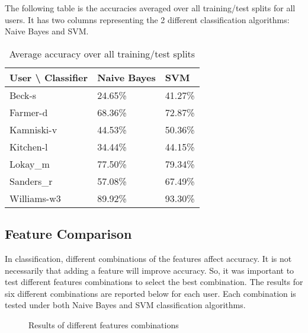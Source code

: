 The following table is the accuracies averaged over all training/test splits for all users. It has two columns representing the 2 different classification algorithms: Naive Bayes and SVM.

\begin{table}
	\begin{center}

	    \begin{tabular}{ | l | l | l |}
	    \hline
	    User {\textbackslash}  Classifier & Naive Bayes & SVM \\ \hline
	    Beck-s & 24.65\% & 41.27\% \\ \hline
	    Farmer-d & 68.36\% & 72.87\% \\ \hline
	    Kamniski-v & 44.53\% & 50.36\% \\ \hline
	    Kitchen-l & 34.44\% & 44.15\% \\ \hline
	    Lokay\_m & 77.50\% & 79.34\% \\ \hline
	    Sanders\_r & 57.08\% & 67.49\% \\ \hline
	    Williams-w3 & 89.92\% & 93.30\% \\
	    \hline
	    \end{tabular}
	\caption{Average accuracy over all training/test splits}
	\end{center}
\end{table}

\subsection{Feature Comparison}
In classification, different combinations of the features affect accuracy. It is not necessarily that adding a feature will improve accuracy. So, it was important to test different features combinations to select the best combination. The results for six different combinations are reported below for each user. Each combination is tested under both Naive Bayes and SVM classification algorithms.

\begin{figure}[H]
    \begin{center}
    \end{center}
    \caption{Results of different features combinations}
\end{figure}

